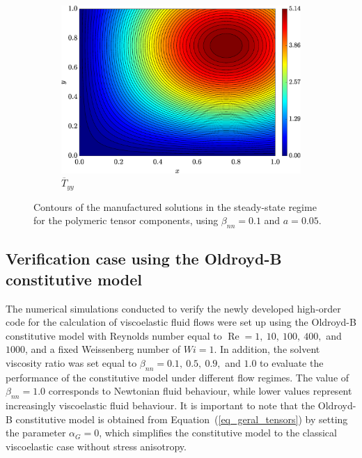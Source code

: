 \documentclass[preprint, 12pt]{elsarticle}
\begin{document}
\begin{figure}[H]
    \begin{subfigure}[b]{.46\textwidth}
        \includegraphics[width=\textwidth]{Exact_Map_NormErr_2nd_Betann_0.1_Re_1_Wi_1_epsilon_0_xi_0_alphaG_0_Dt_1e-06_at_0.05_tipsim_1_MMS_12_Tyy.eps}
        \caption{$\overline{T}_{yy}$}
        \label{fig_solexatyystreamlineCase1}
    \end{subfigure}
    \vspace{0.02cm}
    \caption{Contours of the manufactured solutions in the steady-state regime for the polymeric tensor components, using $\beta_{nn}=0.1$ and $a = 0.05$.\label{fig_Txxxyyy_m_u_sol_num_case1streamline2}}
\end{figure}

\subsection{Verification case using the Oldroyd-B constitutive model}
\label{subsec_oldroydb}

The numerical simulations conducted to verify the newly developed high-order code for the calculation of viscoelastic fluid flows were set up using the Oldroyd-B constitutive model with Reynolds number equal to $\operatorname{Re}=1,\ 10,\ 100,\ 400,$ and $1000$, and a fixed Weissenberg number of $Wi=1$. In addition, the solvent viscosity ratio was set equal to $\beta_{nn} = 0.1,\ 0.5,\ 0.9,$ and $1.0$ to evaluate the performance of the constitutive model under different flow regimes. The value of $\beta_{nn} = 1.0$ corresponds to Newtonian fluid behaviour, while lower values represent increasingly viscoelastic fluid behaviour. It is important to note that the Oldroyd-B constitutive model is obtained from Equation~(\ref{eq_geral_tensors}) by setting the parameter $\alpha_{G} = 0$, which simplifies the constitutive model to the classical viscoelastic case without stress anisotropy.
\end{document}
